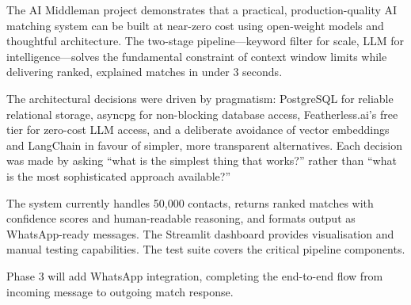 \documentclass[12pt, a4paper]{report}
\begin{document}
The AI Middleman project demonstrates that a practical, production-quality AI matching system can be built at near-zero cost using open-weight models and thoughtful architecture. The two-stage pipeline---keyword filter for scale, LLM for intelligence---solves the fundamental constraint of context window limits while delivering ranked, explained matches in under 3 seconds.

The architectural decisions were driven by pragmatism: PostgreSQL for reliable relational storage, asyncpg for non-blocking database access, Featherless.ai's free tier for zero-cost LLM access, and a deliberate avoidance of vector embeddings and LangChain in favour of simpler, more transparent alternatives. Each decision was made by asking ``what is the simplest thing that works?'' rather than ``what is the most sophisticated approach available?''

The system currently handles 50,000 contacts, returns ranked matches with confidence scores and human-readable reasoning, and formats output as WhatsApp-ready messages. The Streamlit dashboard provides visualisation and manual testing capabilities. The test suite covers the critical pipeline components.

Phase 3 will add WhatsApp integration, completing the end-to-end flow from incoming message to outgoing match response.
\end{document}
